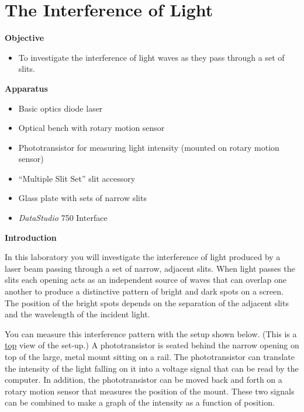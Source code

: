
\section{The Interference of Light}

\makelabheader %

\textbf{Objective}

\begin{itemize}
\item To investigate the interference of light waves as they pass through
a set of slits. 
\end{itemize}
\textbf{Apparatus}

\begin{itemize}
\item Basic optics diode laser
\item Optical bench with rotary motion sensor
\item Phototransistor for measuring light intensity (mounted on rotary motion sensor)
\item ``Multiple Slit Set'' slit accessory
\item Glass plate with sets of narrow slits
\item {\it DataStudio} 750 Interface
\end{itemize}
\textbf{Introduction}

In this laboratory you will investigate the interference of light
produced by a laser beam passing through a set of narrow, adjacent
slits. When light passes the slits each opening acts as an independent
source of waves that can overlap one another to produce a distinctive
pattern of bright and dark spots on a screen. The position of the
bright spots depends on the separation of the adjacent slits and the
wavelength of the incident light. 

You can measure this interference pattern with the setup shown below. 
(This is a \underline{top} view of the set-up.) 
A phototransistor is seated behind the narrow opening on top of the large,
metal mount sitting on a rail. The phototransistor can translate the intensity 
of the light falling on it into a voltage signal that can be read by the
computer. In addition, the phototransistor can be moved back and
forth on a rotary motion sensor that measures the position of the 
mount. These two signals can be combined to
make a graph of the intensity as a function of position.

